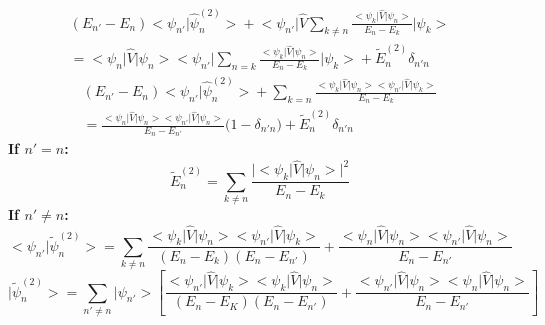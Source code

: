 \documentclass[12pt,fancychapters]{report}
\numberwithin{equation}{section}
\begin{document}
\begin{multline*}
	(E_{n'} - E_n)	\big< \psi_{n'} \big| \hat{\psi}^{(2)}_n \big> + \big<\psi_{n'} \big|
	\hat{V} \sum_{k\neq n} \frac{\big< \psi_k \big| \hat{V} \big| \psi_n \big>}{E_n - E_k}
	\big|\psi_k \big>\\
	= \big<\psi_n \big| \hat{V}\big| \psi_n\big>\big<\psi_{n'}\big|\sum_{n=k}\frac{\big<\psi_k\big|
	\hat{V}\big|\psi_n\big>}{E_n - E_k}\big|\psi_k\big> + \tilde{E}^{(2)}_n \delta_{n'n} 
\end{multline*}
\begin{multline*}
	(E_{n'} - E_n)	\big< \psi_{n'} \big| \hat{\psi}^{(2)}_n \big> +
	\sum_{k=n} \frac{\big<\psi_k\big|\hat{V}\big|\psi_n\big>\big<\psi_{n'}\big|\hat{V}\big|\psi_k\big>}
	{E_n - E_k}\\
	= \frac{\big<\psi_n\big|\hat{V}\big|\psi_n\big>\big<\psi_{n'}\big|\hat{V}\big|\psi_n\big>}
	{E_n - E_{n'}}\bigg(1-\delta_{n'n}\bigg) + \tilde{E}^{(2)}_n \delta_{n'n}
\end{multline*}
\textbf{If $n' = n$:}
\begin{equation*}
	\boxed{\tilde{E}^{(2)}_n = \sum_{k\neq n} \frac{\big|\big<\psi_k\big|\hat{V}\big|\psi_n\big>\big|^2}
	{E_n - E_k}}
\end{equation*}
\textbf{If $n' \neq n$:}
\begin{equation*}
	\big<\psi_{n'}\big|\tilde{\psi}^{(2)}_n \big> = \sum_{k\neq n} \frac{\big<\psi_k\big|\hat{V}\big|
	\psi_n\big>\big<\psi_{n'}\big|\hat{V}\big|\psi_{k}\big>}{(E_n - E_k)(E_n - E_{n'})} + 
	\frac{\big<\psi_n\big|\hat{V}\big|\psi_n\big>\big<\psi_{n'}\big|\hat{V}\big|\psi_n\big>}
	{E_n - E_{n'}}
\end{equation*}
\begin{equation*}
	\big|\tilde{\psi}^{(2)}_n \big> = \sum_{n'\neq n} \bigg| \psi_{n'}\bigg> \left[\frac{\big<\psi_{n'}\big|
	\hat{V}\big|\psi_k\big>\big<\psi_k\big|\hat{V}\big|\psi_n\big>}{(E_n - E_K)(E_n-E_{n'})}
	+\frac{\big<\psi_{n'}\big|\hat{V}\big|\psi_n\big>\big<\psi_n|\hat{V}\big|\psi_n\big>}
	{E_n - E_{n'}}\right] 
\end{equation*}
\newpage
\end{document}
